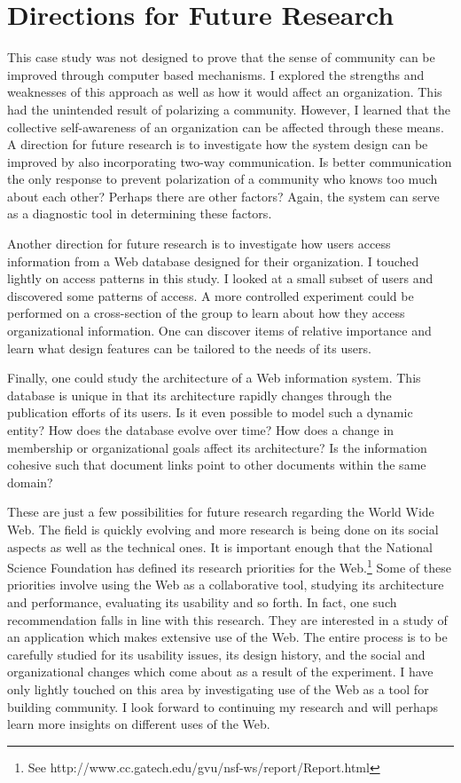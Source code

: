 \section{Directions for Future Research}
This case study was not designed to prove that the sense of community can be
improved through computer based mechanisms.  I explored the strengths and
weaknesses of this approach as well as how it would affect an organization.
This had the unintended result of polarizing a community.  However, I learned
that the collective self-awareness of an organization can be affected through
these means.  A direction for future research is to investigate how the system
design can be improved by also incorporating two-way communication.  Is better
communication the only response to prevent polarization of a community who
knows too much about each other?  Perhaps there are other factors?  Again, the
system can serve as a diagnostic tool in determining these factors.

Another direction for future research is to investigate how users access
information from a Web database designed for their organization.  I touched
lightly on access patterns in this study.  I looked at a small subset of users
and discovered some patterns of access.  A more controlled experiment could be
performed on a cross-section of the group to learn about how they access
organizational information.  One can discover items of relative importance and
learn what design features can be tailored to the needs of its users.

Finally, one could study the architecture of a Web information system.  This
database is unique in that its architecture rapidly changes through the
publication efforts of its users.  Is it even possible to model such a dynamic
entity?  How does the database evolve over time?  How does a change in
membership or organizational goals affect its architecture?  Is the information
cohesive such that document links point to other documents within the same
domain?

These are just a few possibilities for future research regarding the World Wide
Web.  The field is quickly evolving and more research is being done on its
social aspects as well as the technical ones.  It is important enough that the
National Science Foundation has defined its research priorities for the
Web.\footnote{See http://www.cc.gatech.edu/gvu/nsf-ws/report/Report.html} Some
of these priorities involve using the Web as a collaborative tool, studying its
architecture and performance, evaluating its usability and so forth.  In fact,
one such recommendation falls in line with this research.  They are interested
in a study of an application which makes extensive use of the Web.  The entire
process is to be carefully studied for its usability issues, its design
history, and the social and organizational changes which come about as a result
of the experiment.  I have only lightly touched on this area by investigating
use of the Web as a tool for building community.  I look forward to continuing
my research and will perhaps learn more insights on different uses of the Web.

